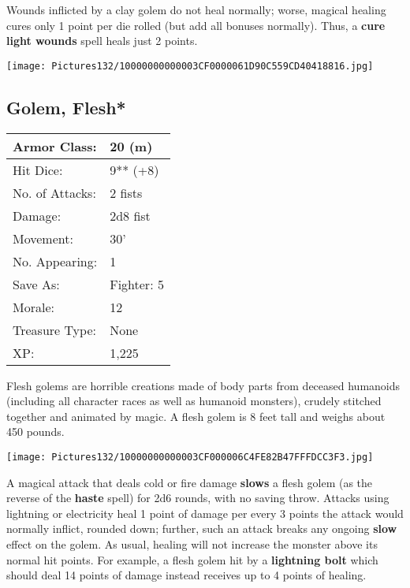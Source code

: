 \documentclass[a4paper,twoside,openany,10pt]{book}
\begin{document}
\begin{multicols}{2}
Wounds inflicted by a clay golem do not heal normally; worse, magical healing cures only 1 point per die rolled (but add all bonuses normally). Thus, a \textbf{cure light wounds }spell heals just 2 points.


\begin{center}
	\texttt{[image: Pictures132/10000000000003CF0000061D90C559CD40418816.jpg]}
\end{center}

\subsection*{Golem, Flesh*}\label{golem-flesh}

\begin{tabularx}{0.48\textwidth}{@{}lX@{}}
Armor Class: & 20 (m) \\\hline
Hit Dice: & 9** (+8) \\\hline
No. of Attacks: & 2 fists \\\hline
Damage: & 2d8 fist \\\hline
Movement: & 30' \\\hline
No. Appearing: & 1 \\\hline
Save As: & Fighter: 5 \\\hline
Morale: & 12 \\\hline
Treasure Type: & None \\\hline
XP: & 1,225 \\\hline
\end{tabularx}\medskip

Flesh golems are horrible creations made of body parts from deceased humanoids (including all character races as well as humanoid monsters), crudely stitched together and animated by magic. A flesh golem is 8 feet tall and weighs about 450 pounds.


\begin{center}
	\texttt{[image: Pictures132/10000000000003CF000006C4FE82B47FFFDCC3F3.jpg]}
\end{center}

A magical attack that deals cold or fire damage
\textbf{slows} a flesh golem (as the reverse of the \textbf{haste} spell) for 2d6 rounds, with no saving throw. Attacks using lightning or electricity heal 1 point of damage per every 3 points the attack would normally inflict, rounded down; further, such an attack breaks any ongoing \textbf{slow} effect on the golem. As usual, healing will not increase the monster above its normal hit points. For example, a flesh golem hit by a \textbf{lightning bolt} which should deal 14 points of damage instead receives up to 4 points of healing.


\end{multicols}
\end{document}
